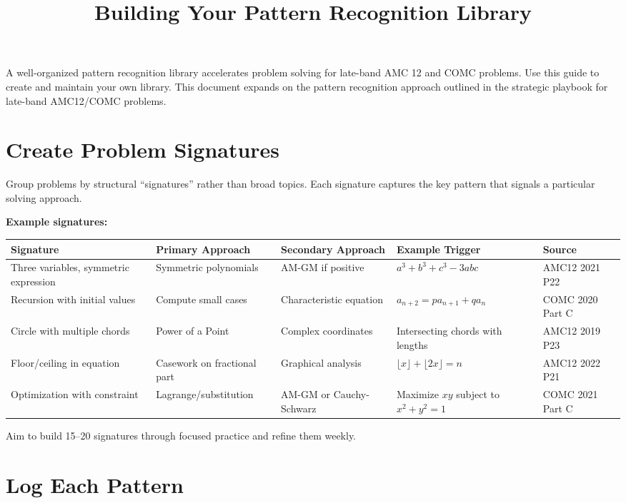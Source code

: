 \documentclass[11pt]{article}
\title{\textbf{Building Your Pattern Recognition Library}}
\author{}
\date{}
\begin{document}
\maketitle

A well-organized pattern recognition library accelerates problem solving for late-band AMC 12 and COMC problems. Use this guide to create and maintain your own library. This document expands on the pattern recognition approach outlined in the strategic playbook for late-band AMC12/COMC problems.

\section{Create Problem Signatures}

Group problems by structural ``signatures'' rather than broad topics. Each signature captures the key pattern that signals a particular solving approach.

\textbf{Example signatures:}

\begin{table}[h]
\centering
\begin{tabular}{@{}p{3cm}p{2.5cm}p{2.5cm}p{3cm}p{2cm}@{}}
\toprule
\textbf{Signature} & \textbf{Primary Approach} & \textbf{Secondary Approach} & \textbf{Example Trigger} & \textbf{Source} \\
\midrule
Three variables, symmetric expression & Symmetric polynomials & AM-GM if positive & $a^3 + b^3 + c^3 - 3abc$ & AMC12 2021 P22 \\
Recursion with initial values & Compute small cases & Characteristic equation & $a_{n+2} = pa_{n+1} + qa_n$ & COMC 2020 Part C \\
Circle with multiple chords & Power of a Point & Complex coordinates & Intersecting chords with lengths & AMC12 2019 P23 \\
Floor/ceiling in equation & Casework on fractional part & Graphical analysis & $\lfloor x \rfloor + \lfloor 2x \rfloor = n$ & AMC12 2022 P21 \\
Optimization with constraint & Lagrange/substitution & AM-GM or Cauchy-Schwarz & Maximize $xy$ subject to $x^2 + y^2 = 1$ & COMC 2021 Part C \\
\bottomrule
\end{tabular}
\end{table}

Aim to build 15--20 signatures through focused practice and refine them weekly.

\section{Log Each Pattern}
\end{document}
